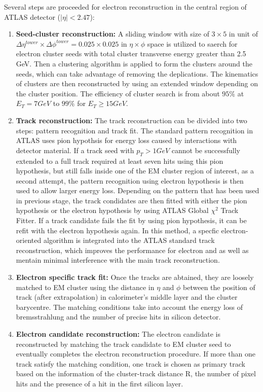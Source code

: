 Several steps are proceeded for electron reconstruction in the central region of ATLAS detector ($|\eta| < 2.47$):
\begin{enumerate}
	\item \textbf{Seed-cluster reconstruction:} A sliding window with size of $3 \times 5$ in unit of $\Delta\eta^{tower} \times \Delta\phi^{tower} = 0.025 \times 0.025$ in $\eta \times \phi$ space is utilized to saerch for electron cluster seeds with total cluster transverse energy greater than 2.5 GeV. Then a clustering algorithm\cite{Lampl:1099735} is applied to form the clusters around the seeds, which can take advantage of removing the deplications. The kinematics of clusters are then reconstructed by using an extended window depending on the cluster position. The efficiency of cluster search is from about $95\%$ at $E_{T} = 7 GeV$ to $99\%$ for $E_{T} \geq 15 GeV$.
	\item \textbf{Track reconstruction:} The track reconstruction can be divided into two steps: pattern recognition and track fit. The standard pattern recognition in ATLAS uses pion hypothsis for energy loss caused by interactions with detector material. If a track seed with $p_{T} > 1 GeV$ cannot be successfully extended to a full track required at least seven hits using this pion hypothesis, but still falls inside one of the EM cluster region of interest, as a second attempt, the pattern recognition using electron hypothesis is then used to allow larger energy loss.
Depending on the pattern that has been used in previous stage, the track condidates are then fitted with either the pion hypothesis or the electron hypothesis by using ATLAS Global $\chi^{2}$ Track Fitter\cite{Cornelissen_2008}. If a track candidate fails the fit by using pion hypothesis, it can be refit with the electron hypothesis again. In this method, a specfic electron-oriented algorithm is integrated into the ATLAS standard track reconstruction, which improves the performance for electron and as well as mentain minimal interference with the main track reconstruction. 
	\item \textbf{Electron specific track fit:} Once the tracks are abtained, they are loosely matched to EM cluster using the distance in $\eta$ and $\phi$ between the position of track (after extrapolation) in calorimeter's middle layer and the cluster barycentre. The matching conditions take into account the energy loss of bremsstrahlung and the number of precise hits in silicon detector.
	\item \textbf{Electron candidate reconstruction:} The electron candidate is reconstructed by matching the track candidate to EM cluster seed to eventually completes the electron reconstruction procedure. If more than one track satisfy the matching condition, one track is chosen as primary track based on the information of the cluster-track distance R, the number of pixel hits and the presence of a hit in the first silicon layer\cite{ATLAS-CONF-2014-032}.

\end{enumerate}
